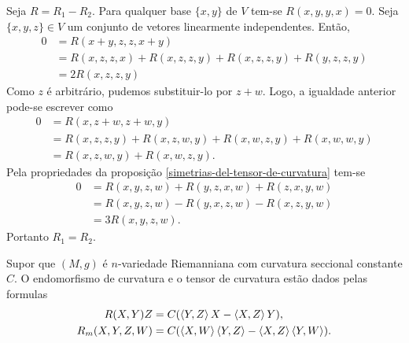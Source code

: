 \begin{demonstracao}
	Seja $R = R_1 - R_2$.
	Para qualquer base $\{x,y\}$ de $V$ tem-se $R(x,y,y,x)=0$.
	Seja $\{x,y,z\} \in V$ um conjunto de vetores linearmente independentes. Então,
	\begin{align*}
	0 &= R(x+y,z,z,x+y)\\
	&= R(x,z,z,x) + R(x,z,z,y) + R(x,z,z,y) + R(y,z,z,y)\\
	&= 2R(x,z,z,y)
	\end{align*}
	Como $z$ é arbitrário, pudemos substituir-lo por $z+w$. Logo, a igualdade anterior pode-se escrever como
	\begin{align*}
	0 &= R(x,z+w,z+w,y)\\
	&= R(x,z,z,y) + R(x,z,w,y) + R(x,w,z,y) + R(x,w,w,y)\\
	&= R(x,z,w,y) + R(x,w,z,y).
	\end{align*}
	Pela propriedades da proposição \ref{simetrias-del-tensor-de-curvatura} tem-se
	\begin{align*}
	0 &= R(x,y,z,w) + R(y,z,x,w) + R(z,x,y,w)\\
	&= R(x,y,z,w) - R(y,x,z,w) - R(x,z,y,w)\\
	&= 3R(x,y,z,w).
	\end{align*}
	Portanto $R_1 = R_2$.
\end{demonstracao}

\begin{proposicao}
	Supor que $(M,g)$ é $n$-variedade Riemanniana com curvatura seccional constante $C$. O endomorfismo de curvatura e o tensor de curvatura estão dados pelas formulas
	\begin{align*}
	R(X,Y)Z &= C(\left\langle Y,Z \right\rangle X - \left\langle X,Z \right\rangle Y),\\
	R_m(X,Y,Z,W) &= C(\left\langle X,W \right\rangle \left\langle Y,Z \right\rangle - \left\langle X,Z \right\rangle \left\langle Y,W \right\rangle).
	\end{align*}
\end{proposicao}

